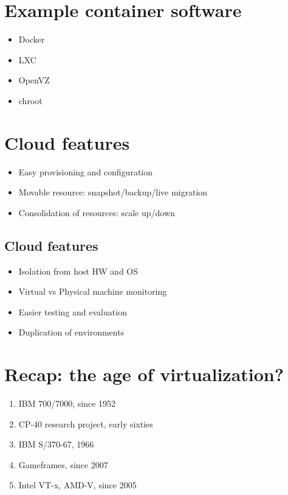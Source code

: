 \documentclass[11pt]{article}
\begin{document}
\section*{Example container software}
\label{sec:orgce742fe}
\begin{itemize}
\item Docker
\item LXC
\item OpenVZ
\item chroot
\end{itemize}

\section*{Cloud features}
\label{sec:org48c206a}
\begin{itemize}
\item Easy provisioning and configuration
\item Movable resource: snapshot/backup/live migration
\item Consolidation of resources: scale up/down
\end{itemize}

\subsection*{Cloud features}
\label{sec:org77aebf2}
\begin{itemize}
\item Isolation from host HW and OS
\item Virtual vs Physical machine monitoring
\item Easier testing and evaluation
\item Duplication of environments
\end{itemize}

\section*{Recap: the age of virtualization?}
\label{sec:org254504f}
\begin{enumerate}
\item IBM 700/7000, since 1952
\item CP-40 research project, early sixties
\item IBM S/370-67, 1966
\item Gameframes, since 2007
\item Intel VT-x, AMD-V, since 2005
\end{enumerate}
\end{document}

